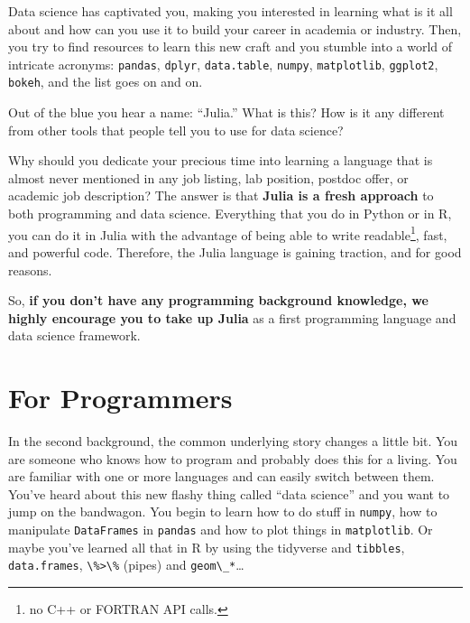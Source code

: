 \documentclass[
  notoc %
]{tufte-book}
\newcommand{\passthrough}[1]{#1}
\begin{document}
Data science has captivated you, making you interested in learning what
is it all about and how can you use it to build your career in academia
or industry. Then, you try to find resources to learn this new craft and
you stumble into a world of intricate acronyms:
\passthrough{\lstinline!pandas!}, \passthrough{\lstinline!dplyr!},
\passthrough{\lstinline!data.table!}, \passthrough{\lstinline!numpy!},
\passthrough{\lstinline!matplotlib!}, \passthrough{\lstinline!ggplot2!},
\passthrough{\lstinline!bokeh!}, and the list goes on and on.

Out of the blue you hear a name: ``Julia.'' What is this? How is it any
different from other tools that people tell you to use for data science?

Why should you dedicate your precious time into learning a language that
is almost never mentioned in any job listing, lab position, postdoc
offer, or academic job description? The answer is that \textbf{Julia is
a fresh approach} to both programming and data science. Everything that
you do in Python or in R, you can do it in Julia with the advantage of
being able to write readable\footnote{no C++ or FORTRAN API calls.},
fast, and powerful code. Therefore, the Julia language is gaining
traction, and for good reasons.

So, \textbf{if you don't have any programming background knowledge, we
highly encourage you to take up Julia} as a first programming language
and data science framework.

\hypertarget{sec:programmers}{%
\section{For Programmers}\label{sec:programmers}}

In the second background, the common underlying story changes a little
bit. You are someone who knows how to program and probably does this for
a living. You are familiar with one or more languages and can easily
switch between them. You've heard about this new flashy thing called
``data science'' and you want to jump on the bandwagon. You begin to
learn how to do stuff in \passthrough{\lstinline!numpy!}, how to
manipulate \passthrough{\lstinline!DataFrames!} in
\passthrough{\lstinline!pandas!} and how to plot things in
\passthrough{\lstinline!matplotlib!}. Or maybe you've learned all that
in R by using the tidyverse and \passthrough{\lstinline!tibbles!},
\passthrough{\lstinline!data.frames!}, \passthrough{\lstinline!\%>\%!}
(pipes) and \passthrough{\lstinline!geom\_*!}\ldots{}
\end{document}
